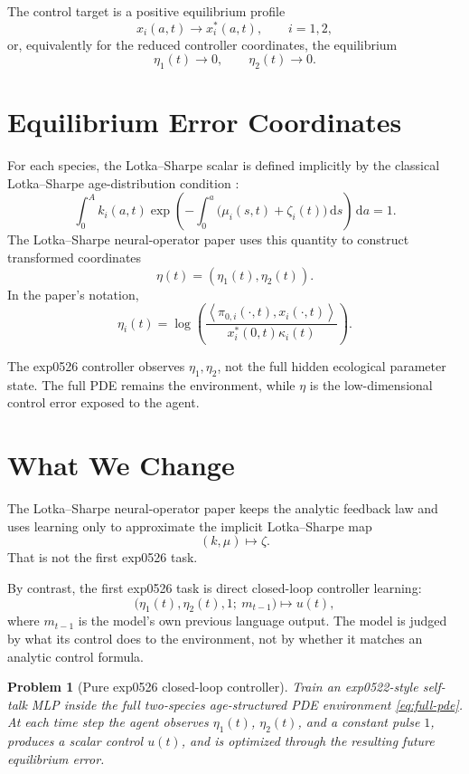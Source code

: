 \documentclass[11pt]{article}
\newtheorem{problem}{Problem}
\newcommand{\dd}{\,\mathrm{d}}
\newcommand{\inner}[2]{\left\langle #1,#2\right\rangle}
\begin{document}
The control target is a positive equilibrium profile
\[
  x_i(a,t)\to x_i^*(a,t),
  \qquad i=1,2,
\]
or, equivalently for the reduced controller coordinates, the equilibrium
\[
  \eta_1(t)\to 0,
  \qquad
  \eta_2(t)\to 0.
\]

\section{Equilibrium Error Coordinates}

For each species, the Lotka--Sharpe scalar is defined implicitly by the
classical Lotka--Sharpe age-distribution condition
\cite{sharpe1911problem}:
\begin{equation}
  \int_0^A
  k_i(a,t)
  \exp\left(
    -\int_0^a \big(\mu_i(s,t)+\zeta_i(t)\big)\dd s
  \right)
  \dd a
  =
  1.
  \label{eq:lotka-sharpe}
\end{equation}
The Lotka--Sharpe neural-operator paper uses this quantity to construct
transformed coordinates \cite{krstic2026lotkasharpe}
\[
  \eta(t)=(\eta_1(t),\eta_2(t)).
\]
In the paper's notation,
\begin{equation}
  \eta_i(t)
  =
  \log\left(
    \frac{\inner{\pi_{0,i}(\cdot,t)}{x_i(\cdot,t)}}{x_i^*(0,t)\kappa_i(t)}
  \right).
  \label{eq:eta}
\end{equation}

The exp0526 controller observes \(\eta_1,\eta_2\), not the full hidden
ecological parameter state. The full PDE remains the environment, while
\(\eta\) is the low-dimensional control error exposed to the agent.

\section{What We Change}

The Lotka--Sharpe neural-operator paper keeps the analytic feedback law
and uses learning only
to approximate the implicit Lotka--Sharpe map
\[
  (k,\mu)\mapsto\zeta.
\]
That is not the first exp0526 task.

By contrast, the first exp0526 task is direct closed-loop controller
learning:
\[
  \big(\eta_1(t),\eta_2(t),1;\ m_{t-1}\big)
  \longmapsto
  u(t),
\]
where \(m_{t-1}\) is the model's own previous language output. The model
is judged by what its control does to the environment, not by whether it
matches an analytic control formula.

\begin{problem}[Pure exp0526 closed-loop controller]
Train an exp0522-style self-talk MLP inside the full two-species
age-structured PDE environment \eqref{eq:full-pde}. At each time step the
agent observes \(\eta_1(t)\), \(\eta_2(t)\), and a constant pulse \(1\),
produces a scalar control \(u(t)\), and is optimized through the resulting
future equilibrium error.
\end{problem}
\end{document}
